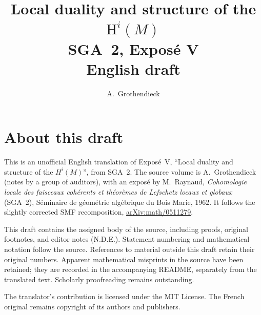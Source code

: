 \documentclass[11pt,a4paper,oneside]{amsbook}
\title[SGA~2, Exposé V (English draft)]{Local duality and structure of the $\mathrm{H}^i(M)$\\
{\normalsize SGA~2, Exposé V\\English draft}}
\author{A.\ Grothendieck}
\date{}
\begin{document}
\frontmatter
\maketitle

\chapter*{About this draft}
This is an unofficial English translation of Expos\'e~V, ``Local duality and structure of the $H^i(M)$'',
from SGA~2. The source volume is A.\ Grothendieck
(notes by a group of auditors), with an expos\'e by M.\ Raynaud,
\textit{Cohomologie locale des faisceaux coh\'erents et th\'eor\`emes
de Lefschetz locaux et globaux} (SGA~2), S\'eminaire de g\'eom\'etrie
alg\'ebrique du Bois Marie, 1962. It follows the slightly corrected
SMF recomposition,
\href{https://arxiv.org/abs/math/0511279}{arXiv:math/0511279}.

This draft contains the assigned body of the source, including proofs,
original footnotes, and editor notes (N.D.E.). Statement numbering and
mathematical notation follow the source. References to material outside
this draft retain their original numbers. Apparent mathematical
misprints in the source have been retained; they are recorded in the
accompanying README, separately from the translated text. Scholarly
proofreading remains outstanding.

The translator's contribution is licensed under
the MIT License.
The French original remains copyright of its authors and publishers.

\tableofcontents
\mainmatter
\setcounter{chapter}{4}


\end{document}
